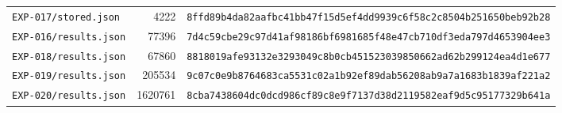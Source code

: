 \begin{tabular}{@{}>{\raggedright\arraybackslash}p{4.2cm}r>{\raggedright\arraybackslash}p{7cm}@{}}
\texttt{EXP-017/stored.json} & 4222 & \texttt{\scriptsize 8ffd89b4da82aafbc41bb47f15d5ef4d\allowbreak d9939c6f58c2c8504b251650beb92b28}\\
\texttt{EXP-016/results.json} & 77396 & \texttt{\scriptsize 7d4c59cbe29c97d41af98186bf698168\allowbreak 5f48e47cb710df3eda797d4653904ee3}\\
\texttt{EXP-018/results.json} & 67860 & \texttt{\scriptsize 8818019afe93132e3293049c8b0cb451\allowbreak 523039850662ad62b299124ea4d1e677}\\
\texttt{EXP-019/results.json} & 205534 & \texttt{\scriptsize 9c07c0e9b8764683ca5531c02a1b92ef\allowbreak 89dab56208ab9a7a1683b1839af221a2}\\
\texttt{EXP-020/results.json} & 1620761 & \texttt{\scriptsize 8cba7438604dc0dcd986cf89c8e9f713\allowbreak 7d38d2119582eaf9d5c95177329b641a}\\
\bottomrule
\end{tabular}
